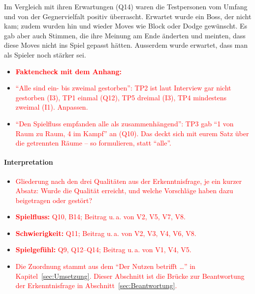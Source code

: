 \documentclass[../Main.tex]{subfiles}
\begin{document}
Im Vergleich mit ihren Erwartungen (Q14) waren die Testpersonen vom Umfang und von der Gegnervielfalt positiv überrascht. Erwartet wurde ein Boss, der nicht kam; zudem wurden hin und wieder Moves wie Block oder Dodge gewünscht. Es gab aber auch Stimmen, die ihre Meinung am Ende änderten und meinten, dass diese Moves nicht ins Spiel gepasst hätten. Ausserdem wurde erwartet, dass man als Spieler noch stärker sei.

\begin{itemize}[leftmargin=1.5cm]
    \item \textcolor{red}{\textbf{Faktencheck mit dem Anhang:}}
    \item \textcolor{red}{\enquote{Alle sind ein- bis zweimal gestorben}: TP2 ist laut Interview gar nicht gestorben (I3), TP1 einmal (Q12), TP5 dreimal (I3), TP4 mindestens zweimal (I1). Anpassen.}
    \item \textcolor{red}{\enquote{Den Spielfluss empfanden alle als zusammenhängend}: TP3 gab \enquote{1 von Raum zu Raum, 4 im Kampf} an (Q10). Das deckt sich mit eurem Satz über die getrennten Räume -- so formulieren, statt \enquote{alle}.}
\end{itemize}

\paragraph{Interpretation}
\begin{itemize}[leftmargin=1.5cm]
    \item \textcolor{red}{Gliederung nach den drei Qualitäten aus der Erkenntnisfrage, je ein kurzer Absatz: Wurde die Qualität erreicht, und welche Vorschläge haben dazu beigetragen oder gestört?}
    \item \textcolor{red}{\textbf{Spielfluss:} Q10, B14; Beitrag u.\,a. von V2, V5, V7, V8.}
    \item \textcolor{red}{\textbf{Schwierigkeit:} Q11; Beitrag u.\,a. von V2, V3, V4, V6, V8.}
    \item \textcolor{red}{\textbf{Spielgefühl:} Q9, Q12--Q14; Beitrag u.\,a. von V1, V4, V5.}
    \item \textcolor{red}{Die Zuordnung stammt aus dem \enquote{Der Nutzen betrifft \ldots} in Kapitel~\ref{sec:Umsetzung}. Dieser Abschnitt ist die Brücke zur Beantwortung der Erkenntnisfrage in Abschnitt~\ref{sec:Beantwortung}.}
\end{itemize}
\end{document}
